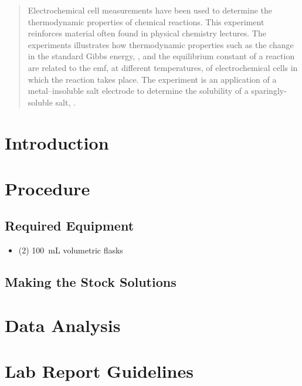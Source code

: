 \maketitle

\begin{abstract}
\noindent Electrochemical cell measurements have been used to determine the thermodynamic properties of chemical reactions.\cite{1,2}
This experiment reinforces material often found in physical chemistry lectures. 
The experiments illustrates how thermodynamic properties such as the change in the standard Gibbs energy, , and the equilibrium constant of a reaction are related to the emf, at different temperatures, of electrochemical cells in which the reaction takes place. 
The experiment is an application of a metal--insoluble salt electrode to determine the solubility of a sparingly-soluble salt, . 
\end{abstract}

\section{Introduction}
\label{sec:intro}


\section{Procedure}
\label{sec:procedure}

\subsection{Required Equipment}
\label{subs:required_equipment}

\begin{itemize}
	\item (2) \qty{100}{\mL} volumetric flasks
\end{itemize}

\subsection{Making the Stock Solutions}
\label{subs:stock_solutions}


\section{Data Analysis}
\label{sec:data_analysis}


\section{Lab Report Guidelines} %
\label{sec:lab_report_guidelines}

